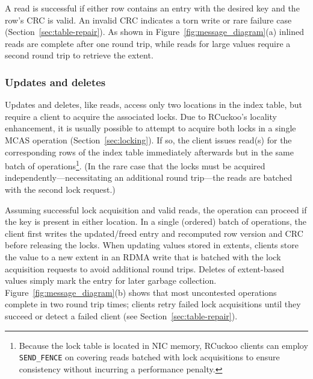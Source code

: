 A read is successful if
either row contains an entry with the desired key and the row's CRC is
valid. An invalid CRC indicates a torn write or rare
failure case (Section~\ref{sec:table-repair}).  As shown in
Figure~\ref{fig:message_diagram}(a) inlined reads are complete after
one round trip, while reads for large values require a second round
trip to retrieve the extent.


\subsubsection{Updates and deletes}

Updates and deletes, like reads, access only two locations in the
index table, but require a client to acquire the associated locks.
Due to RCuckoo's locality enhancement, it is usually possible to attempt
to acquire both locks in a single MCAS operation
(Section~\ref{sec:locking}).  If so, the client issues read(s) for the
corresponding rows of the index table immediately afterwards but in
the same batch of operations\footnote{Because the lock table is located in NIC memory, RCuckoo clients can employ \texttt{SEND\_FENCE} on covering
reads batched with lock acquisitions to ensure consistency without incurring a performance penalty.}.  (In the rare case that the locks must
be acquired independently---necessitating an additional round
trip---the reads are batched with the second lock request.)

Assuming
successful lock acquisition and valid reads, the operation can proceed
if the key is present in either location.  In a single (ordered) batch
of operations, the client first writes the updated/freed entry and
recomputed row version and CRC before releasing the locks. When
updating values stored in extents, clients store the value to a new
extent in an RDMA write that is batched with the lock acquisition
requests to avoid additional round trips.  Deletes of extent-based
values simply mark the entry for later garbage collection.
Figure~\ref{fig:message_diagram}(b) shows that most uncontested operations
complete in two round trip times; clients retry failed lock
acquisitions until they succeed or detect a failed client (see
Section~\ref{sec:table-repair}).



